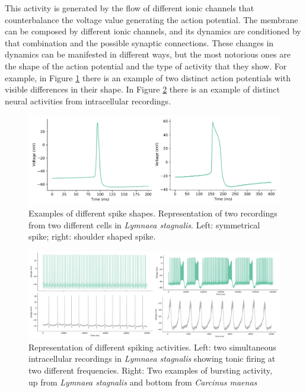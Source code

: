 This activity is generated by the flow of different ionic channels that counterbalance the voltage value generating the action potential. The membrane can be composed by different ionic channels, and its dynamics are conditioned by that combination and the possible synaptic connections. These changes in dynamics can be manifested in different ways, but the most notorious ones are the shape of the action potential and the type of activity that they show. %
For example, in Figure \ref{fig:spike-types} there is an example of two distinct action potentials with visible differences in their shape. In Figure \ref{fig:spike_activity-types} there is an example of distinct neural activities from intracellular recordings. 
\begin{figure}[htb!]
    \centering
    \includegraphics[width=\linewidth]{img/intro/spike-types.pdf}
    \caption{Examples of different spike shapes. Representation of two recordings from two different cells in \textit{Lymnaea stagnalis}. Left: symmetrical spike; right: shoulder shaped spike.}
    \label{fig:spike-types}
\end{figure}
\begin{figure}[htb!]
    \centering
    \includegraphics[width=\linewidth]{img/intro/spike_activity-types.pdf}
    \caption{Representation of different spiking activities. Left: two simultaneous intracellular recordings in \textit{Lymnaea stagnalis} showing tonic firing at two different frequencies. Right: Two examples of bursting activity, up from \textit{Lymnaea stagnalis} and bottom from \textit{Carcinus maenas}}
    \label{fig:spike_activity-types}
\end{figure}

